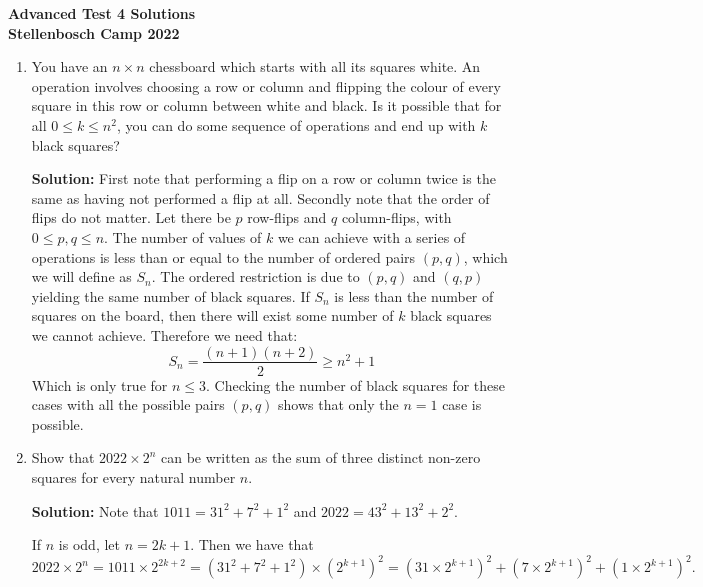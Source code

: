 \documentclass{article}
\begin{document}
\thispagestyle{empty}

\begin{center}
  \textbf{\Large Advanced Test 4 Solutions}
  \\ \vspace{1em}
  \textbf{\large Stellenbosch Camp 2022}
  \\ \vspace{1em}
\end{center}

\bigskip \bigskip

\begin{enumerate}[itemsep=24pt]

\item %
You have an $n \times n$ chessboard which starts with all its squares white.
An operation involves choosing a row or column and flipping the colour of every square in this row or column between white and black.
Is it possible that for all $0 \leq k \leq n^2$, you can do some sequence of operations and end up with $k$ black squares?

\textbf{Solution:}
First note that performing a flip on a row or column twice is the same as having not performed a flip at all. Secondly note that the order of flips do not matter. Let there be $p$ row-flips and $q$ column-flips, with $0\leq p,q\leq n$. The number of values of $k$ we can achieve with a series of operations is less than or equal to the number of ordered pairs $(p,q)$, which we will define as $S_n$. The ordered restriction is due to $(p,q)$ and $(q,p)$ yielding the same number of black squares. If $S_n$ is less than the number of squares on the board, then there will exist some number of $k$ black squares we cannot achieve. Therefore we need that:
$$S_n = \frac{(n+1)(n+2)}{2} \geq n^2 + 1$$
Which is only true for $n\leq3$. Checking the number of black squares for these cases with all the possible pairs $(p,q)$ shows that only the $n=1$ case is possible.


\item %
Show that $2022 \times 2^n$ can be written as the sum of three distinct non-zero squares for every natural number $n$.

\textbf{Solution:}
Note that $1011 = 31^2 + 7^2 + 1^2$ and $2022 = 43^2 + 13^2 + 2^2$.

If $n$ is odd, let $n = 2k + 1$. Then we have that
\[
    2022 \times 2^n = 1011 \times 2^{2k + 2} = \left( 31^2 + 7^2 + 1^2 \right) \times {\left( 2^{k + 1} \right)}^2 = {\left( 31 \times 2^{k + 1} \right)}^2 + {\left( 7 \times 2^{k + 1} \right)}^2 + {\left( 1 \times 2^{k + 1} \right)}^2.
\]


\end{enumerate}
\end{document}
